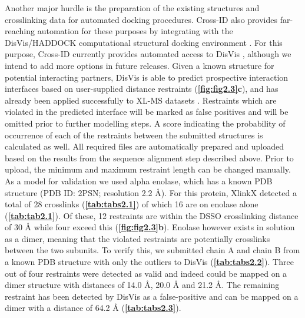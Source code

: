 Another major hurdle is the preparation of the existing structures and crosslinking data for automated docking procedures. Cross-ID also provides far-reaching automation for these purposes by integrating with the DisVis/HADDOCK computational structural docking environment \cite{dominguez2003haddock:, zundert2016haddock, zundert2015disvis:, zundert2016disvis}. For this purpose, Cross-ID currently provides automated access to DisVis \cite{zundert2016disvis, zundert2015disvis:}, although we intend to add more options in future releases. Given a known structure for potential interacting partners, DisVis is able to predict prospective interaction interfaces based on user-supplied distance restraints (\textbf{\autoref{fig:fig2.3}c}), and has already been applied successfully to XL-MS datasets \cite{klykov2018efficient}. Restraints which are violated in the predicted interface will be marked as false positives and will be omitted prior to further modelling steps. A score indicating the probability of occurrence of each of the restraints between the submitted structures is calculated as well. All required files are automatically prepared and uploaded based on the results from the sequence alignment step described above. Prior to upload, the minimum and maximum restraint length can be changed manually. As a model for validation we used alpha enolase, which has a known PDB structure (PDB ID: 2PSN; resolution 2.2 Å). For this protein, XlinkX detected a total of 28 crosslinks (\textbf{\autoref{tab:tabs2.1}}) of which 16 are on enolase alone (\textbf{\autoref{tab:tab2.1}}). Of these, 12 restraints are within the DSSO crosslinking distance of 30 Å while four exceed this (\textbf{\autoref{fig:fig2.3}b}). Enolase however exists in solution as a dimer, meaning that the violated restraints are potentially crosslinks between the two subunits. To verify this, we submitted chain A and chain B from a known PDB structure with only the outliers to DisVis (\textbf{\autoref{tab:tabs2.2}}). Three out of four restraints were detected as valid and indeed could be mapped on a dimer structure with distances of 14.0 Å, 20.0 Å and 21.2 Å. The remaining restraint has been detected by DisVis as a false-positive and can be mapped on a dimer with a distance of 64.2 Å (\textbf{\autoref{tab:tabs2.3}}).



